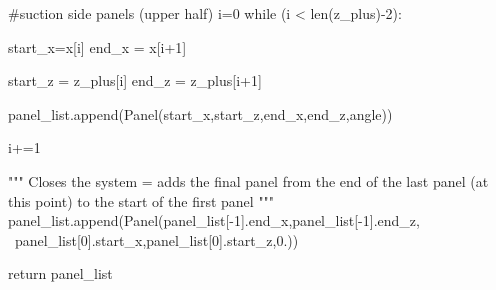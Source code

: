 \documentclass[a4paper,12pt]{article}
\begin{document}
\begin{python}
        #suction side panels (upper half)
        i=0
        while (i < len(z_plus)-2):

                start_x=x[i]
                end_x = x[i+1]

                start_z = z_plus[i]
                end_z = z_plus[i+1]

                panel_list.append(Panel(start_x,start_z,end_x,end_z,angle))
                
                i+=1

        """
        Closes the system = adds the final panel from the end 
        of the last panel (at this point) 
        to the start of the first panel
        """
        panel_list.append(Panel(panel_list[-1].end_x,panel_list[-1].end_z,
                    \ panel_list[0].start_x,panel_list[0].start_z,0.))

        return panel_list
\end{python}
\end{document}
